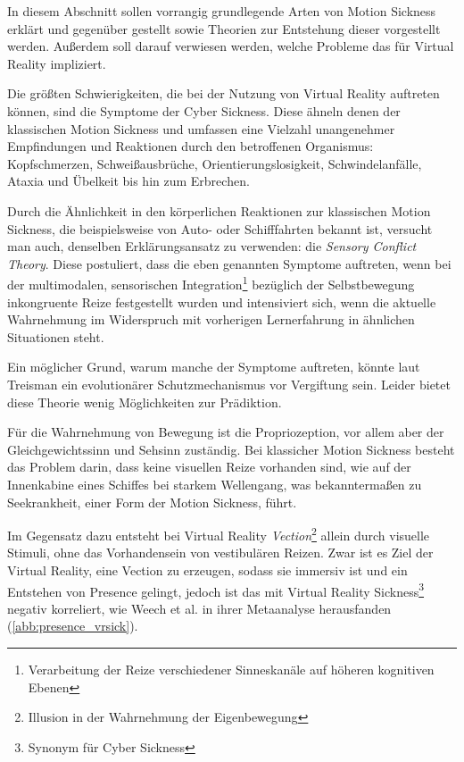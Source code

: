 In diesem Abschnitt sollen vorrangig grundlegende Arten von Motion Sickness erkl\"art und gegen\"uber gestellt sowie Theorien zur Entstehung dieser vorgestellt werden. Au{\ss}erdem soll darauf verwiesen werden, welche Probleme das f\"ur Virtual Reality impliziert.

Die gr\"o{\ss}ten Schwierigkeiten, die bei der Nutzung von Virtual Reality auftreten k\"onnen, sind die Symptome der Cyber Sickness. Diese \"ahneln denen der klassischen Motion Sickness und umfassen eine Vielzahl unangenehmer Empfindungen und Reaktionen durch den betroffenen Organismus: Kopfschmerzen, Schwei{\ss}ausbr\"uche, Orientierungslosigkeit, Schwindelanf\"alle, Ataxia und \"Ubelkeit bis hin zum Erbrechen\cite{LaViola:2000:CSinVR, Kolasinski:1998:SympCS}.

Durch die \"Ahnlichkeit in den k\"orperlichen Reaktionen zur klassischen Motion Sickness, die beispielsweise von Auto- oder Schifffahrten bekannt ist, versucht man auch, denselben Erkl\"arungsansatz zu verwenden: die \textit{Sensory Conflict Theory}\cite{Kolasinski:1998:SympCS,Johnson:2005:SCT_Expl}.
Diese postuliert, dass die eben genannten Symptome auftreten, wenn bei der multimodalen, sensorischen Integration\footnote{ Verarbeitung der Reize verschiedener Sinneskan\"ale auf h\"oheren kognitiven Ebenen} bez\"uglich der Selbstbewegung inkongruente Reize festgestellt wurden und intensiviert sich, wenn die aktuelle Wahrnehmung im Widerspruch mit vorherigen Lernerfahrung in \"ahnlichen Situationen steht\cite{Reason:1975:MSexp}.

Ein m\"oglicher Grund, warum manche der Symptome auftreten, k\"onnte laut Treisman\cite{Treisman:1977:Toxic} ein evolution\"arer Schutzmechanismus vor Vergiftung sein. Leider bietet diese Theorie wenig M\"oglichkeiten zur Pr\"adiktion.

F\"ur die Wahrnehmung von Bewegung ist die Propriozeption, vor allem aber der Gleichgewichtssinn und Sehsinn zust\"andig.
Bei klassicher Motion Sickness besteht das Problem darin, dass keine visuellen Reize vorhanden sind, wie auf der Innenkabine eines Schiffes bei starkem Wellengang, was bekannterma{\ss}en zu Seekrankheit, einer Form der Motion Sickness, f\"uhrt.

Im Gegensatz dazu entsteht bei Virtual Reality \textit{Vection}\footnote{ Illusion in der Wahrnehmung der Eigenbewegung} allein durch visuelle Stimuli, ohne das Vorhandensein von vestibul\"aren Reizen.
Zwar ist es Ziel der Virtual Reality, eine Vection zu erzeugen, sodass sie immersiv ist und ein Entstehen von Presence gelingt, jedoch ist das mit Virtual Reality Sickness\footnote{Synonym f\"ur Cyber Sickness} negativ korreliert, wie Weech et al.\cite{Weech:2019:PresenceCS} in ihrer Metaanalyse herausfanden (\autoref{abb:presence_vrsick}).

